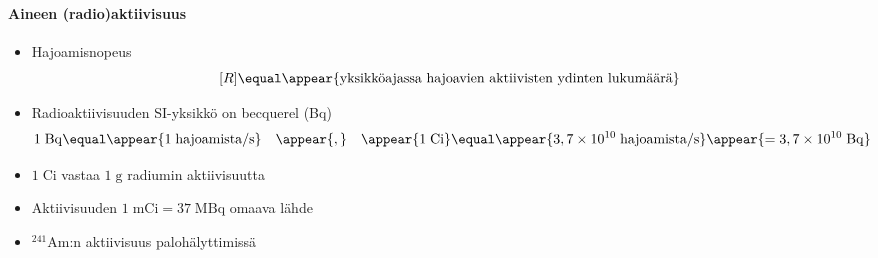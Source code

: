 \begin{frame}
\frametitle{\texorpdfstring{\culine[\sectiontitleulinecolor]{\sectiontitle}}{\sectiontitle} }
\framesubtitle{Aineen (radio)aktiivisuus}%
\appear{}

\begin{itemize}
	\item Hajoamisnopeus     
\[
[ R ]  \equal  \appear{\text{yksikköajassa hajoavien aktiivisten ydinten lukumäärä}}
\]
\vspace{-3mm}
\item Radioaktiivisuuden SI-yksikkö on becquerel (Bq)
\[
1 \mathrm{\;Bq}  \equal \appear{1 \text {\;hajoamista} / \mathrm{s}} \quad \appear{,} \quad 
\appear{1 \mathrm{\;Ci}}  \equal  \appear{3,7 \times 10^{10} \text {\;hajoamista} / \mathrm{s}}\appear{=3,7 \times 10^{10} \mathrm{\;Bq}}
\]
\item $1 \mathrm{\;Ci}$ vastaa $1 \mathrm{\;g}$ radiumin aktiivisuutta 

\item Aktiivisuuden $1 \mathrm{\;mCi}=37 \mathrm{\;MBq}$ omaava lähde  

\item ${ }^{241} \mathrm{Am}$:n aktiivisuus palohälyttimissä 
\end{itemize}

\endofslide 
\end{frame}

